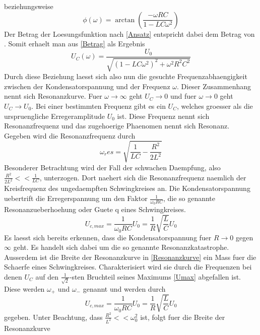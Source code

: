 \documentclass[titlepage=firstcover, captions=tableheading]{scrartcl}
\begin{document}
beziehungsweise
\begin{equation}\label{phi}
    \phi(\omega)=\arctan(\frac{-\omega RC}{1-LC\omega^2})
\end{equation}
Der Betrag der Loesungsfunktion nach \ref{Ansatz} entspricht dabei dem Betrag von \xi. Somit erhaelt man aus \ref{Betrag} als Ergebnis
\begin{equation} \label{Resonanzkurve}
    U_C(\omega)=\frac{U_0}{\sqrt{(1-LC\omega^2)^2+\omega^2R^2C^2}}
\end{equation}
Durch diese Beziehung laesst sich also nun die gesuchte Frequenzabhaengigkeit zwischen der Kondensatorspannung und der Frequenz $\omega$. Dieser Zusammenhang nennt sich Resonanzkurve. Fuer $\omega\rightarrow\infty$ geht $U_C\rightarrow 0$ und fuer $\omega\rightarrow 0$ geht $U_C\rightarrow U_0$. Bei einer bestimmten Frequenz gibt es ein $U_C$, welches groesser als die urspruengliche Erregeramplitude $U_0$ ist. Diese Frequenz nennt sich Resonanzfrequenz und das zugehoerige Phaenomen nennt sich Resonanz. Gegeben wird die Resonanzfrequenz durch
\begin{equation}
    \omega_res=\sqrt{\frac{1}{LC}-\frac{R^2}{2L^2}} \nonumber
\end{equation}
Besonderer Betrachtung wird der Fall der schwachen Daempfung, also $\frac{R^2}{2L^2}<<\frac{1}{LC}$, unterzogen. Dort naehert sich die Resonanzfrequenz naemlich der Kreisfrequenz des ungedaempften Schwingkreises an. Die Kondensatorspannung uebertrift die Erregerspannung um den Faktor $\frac{1}{\omega_0RC}$, die so genannte Resonanzueberhoehung oder Guete q eines Schwingkreises.
\begin{equation}\label{Umax}
    U_{c,max}=\frac{1}{\omega_0RC}U_0=\frac{1}{R}\sqrt{\frac{L}{C}}U_0 
\end{equation}
Es laesst sich bereits erkennen, dass die Kondensatorspannung fuer $R\rightarrow 0$ gegen $\infty$ geht. Es handelt sich dabei um die so genannte Resonanzkatastrophe. Ausserdem ist die Breite der Resonanzkurve in \ref{Resonanzkurve} ein Mass fuer die Schaerfe eines Schwingkreises. Charakterisiert wird sie durch die Frequenzen bei denen $U_C$ auf den $\frac{1}{\sqrt{2}}$-sten Bruchteil seines Maximums \ref{Umax} abgefallen ist. Diese werden $\omega_+$ und $\omega_-$ genannt und werden durch 
\begin{equation}
    U_{c,max}=\frac{1}{\omega_0RC}U_0=\frac{1}{R}\sqrt{\frac{L}{C}}U_0 \nonumber
\end{equation}
gegeben. Unter Beachtung, dass $\frac{R^2}{L^2}<<\omega_0^2$ ist, folgt fuer die Breite der Resonanzkurve
\end{document}

